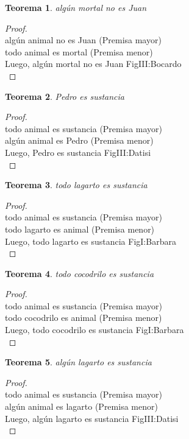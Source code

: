 ﻿\documentclass[12pt]{book}
\newtheorem{theorem}{Teorema}[chapter]
\newtheorem{proof}{Demostración}
\begin{document}
\begin{theorem}
algún mortal no es Juan
\label{th: 81}
\end{theorem}\begin{proof}\\algún animal no es Juan	 (Premisa mayor) \\todo animal es mortal	 (Premisa menor) \\Luego, algún mortal no es Juan	FigIII:Bocardo \\ \end{proof}
\begin{theorem}
Pedro es sustancia
\label{th: 82}
\end{theorem}\begin{proof}\\todo animal es sustancia	 (Premisa mayor) \\algún animal es Pedro	 (Premisa menor) \\Luego, Pedro es sustancia	FigIII:Datisi \\ \end{proof}
\begin{theorem}
todo lagarto es sustancia
\label{th: 83}
\end{theorem}\begin{proof}\\todo animal es sustancia	 (Premisa mayor) \\todo lagarto es animal	 (Premisa menor) \\Luego, todo lagarto es sustancia	FigI:Barbara \\ \end{proof}
\begin{theorem}
todo cocodrilo es sustancia
\label{th: 84}
\end{theorem}\begin{proof}\\todo animal es sustancia	 (Premisa mayor) \\todo cocodrilo es animal	 (Premisa menor) \\Luego, todo cocodrilo es sustancia	FigI:Barbara \\ \end{proof}
\begin{theorem}
algún lagarto es sustancia
\label{th: 85}
\end{theorem}\begin{proof}\\todo animal es sustancia	 (Premisa mayor) \\algún animal es lagarto	 (Premisa menor) \\Luego, algún lagarto es sustancia	FigIII:Datisi \\ \end{proof}
\end{document}
